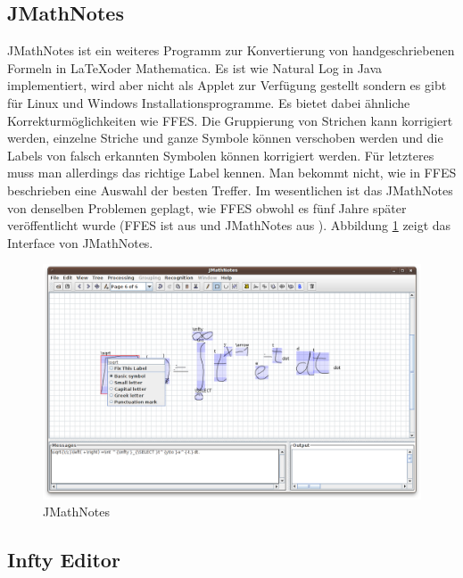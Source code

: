 \subsection{JMathNotes}

JMathNotes ist ein weiteres Programm zur Konvertierung von handgeschriebenen Formeln in \LaTeX oder Mathematica.  Es ist wie Natural Log in Java implementiert, wird aber nicht als Applet zur Verfügung gestellt sondern es gibt für Linux und Windows Installationsprogramme. Es bietet dabei ähnliche Korrekturmöglichkeiten wie FFES. Die Gruppierung von Strichen kann korrigiert werden, einzelne Striche und ganze Symbole können verschoben werden und die Labels von falsch erkannten Symbolen können korrigiert werden. Für letzteres muss man allerdings das richtige Label kennen. Man bekommt nicht, wie in FFES beschrieben eine Auswahl der besten Treffer.
Im wesentlichen ist das JMathNotes von denselben Problemen geplagt, wie FFES obwohl es fünf Jahre später veröffentlicht wurde (FFES ist aus \citeyear{Matasakis:1999p9465} und JMathNotes aus \citeyear{jmathnotes}). Abbildung \ref{fig:jmathnotes} zeigt das Interface von JMathNotes.

\begin{figure}[htbp]
  \begin{center}
    \includegraphics[width=\textwidth]{figures/jmathnotes.png}
  \end{center}
  \caption{JMathNotes}
  \label{fig:jmathnotes}
\end{figure}

\subsection{Infty Editor}

